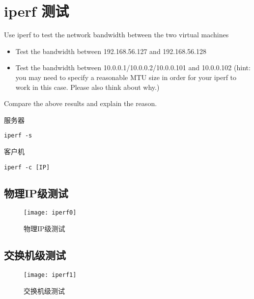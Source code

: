     \section{iperf 测试}
    Use iperf to test the network bandwidth between the two virtual machines 
    \begin{itemize}
        \item Test the bandwidth between 192.168.56.127 and 192.168.56.128
        \item Test the bandwidth between 10.0.0.1/10.0.0.2/10.0.0.101 and 10.0.0.102 (hint: you may need to specify a reasonable MTU size in order for your iperf to work in this case. Please also think about why.)
    \end{itemize}

    Compare the above results and explain the reason. 

    服务器
    \begin{lstlisting}[style=commandshell]
iperf -s\end{lstlisting}

    客户机
    \begin{lstlisting}[style=commandshell]
iperf -c [IP]\end{lstlisting}



    \subsection{物理IP级测试}

    \begin{figure}[H]
        \centering
        \texttt{[image: iperf0]}
        \caption{物理IP级测试}\label{fig:iperf0}
    \end{figure}

    \subsection{交换机级测试}

    \begin{figure}[H]
        \centering
        \texttt{[image: iperf1]}
        \caption{交换机级测试}\label{fig:iperf1}
    \end{figure}


